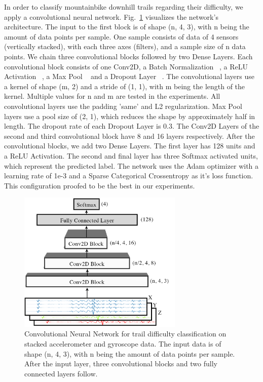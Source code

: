 \documentclass[runningheads]{llncs}
\begin{document}
In order to classify mountainbike downhill trails regarding their difficulty, we apply a convolutional neural network.
Fig.~\ref{fig3} visualizes the network's architecture.
The input to the first block is of shape (n, 4, 3), with n being the amount of data points per sample. 
One sample consists of data of 4 sensors (vertically stacked), with each three axes (filters), and a sample size of n data points.
We chain three convolutional blocks followed by two Dense Layers.
Each convolutional block consists of one Conv2D, a Batch Normalization ~\cite{ioffe2015batch}, a ReLU Activation ~\cite{hahnloser2000digital}, a Max Pool ~\cite{matsugu2003subject} and a Dropout Layer ~\cite{srivastava2014dropout}.
The convolutional layers use a kernel of shape (m, 2) and a stride of (1, 1), with m being the length of the kernel.
Multiple values for n and m are tested in the experiments.
All convolutional layers use the padding 'same' and L2 regularization.
Max Pool layers use a pool size of (2, 1), which reduces the shape by approximately half in length.
The dropout rate of each Dropout Layer is 0.3.
The Conv2D Layers of the second and third convolutional block have 8 and 16 layers respectively.
After the convolutional blocks, we add two Dense Layers. 
The first layer has 128 units and a ReLU Activation.
The second and final layer has three Softmax activated units, which represent the predicted label.
The network uses the Adam optimizer with a learning rate of 1e-3 and a Sparse Categorical Crossentropy as it's loss function.
This configuration proofed to be the best in our experiments.

\begin{figure}
\centering 
\includegraphics[width=0.70\textwidth]{network.jpg}
\caption{Convolutional Neural Network for trail difficulty classification on stacked accelerometer and gyroscope data. 
The input data is of shape (n, 4, 3), with n being the amount of data points per sample. 
After the input layer, three convolutional blocks and two fully connected layers follow.}
\label{fig3}	
\end{figure}
\end{document}
